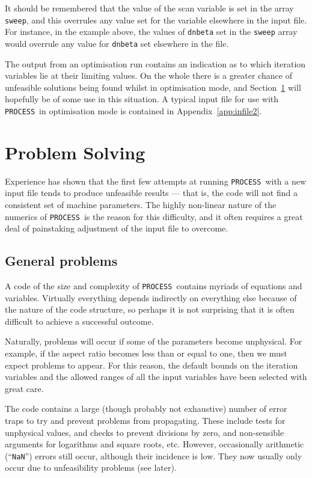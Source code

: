 \documentclass[11pt,a4paper]{report}
\newcommand{\process}{\mbox{\texttt{PROCESS}}}
\begin{document}
It should be remembered that the value of the scan variable is set in the
array \texttt{sweep}, and this overrules any value set for the variable
elsewhere in the input file. For instance, in the example above, the values of
\texttt{dnbeta} set in the \texttt{sweep} array would overrule any value for
\texttt{dnbeta} set elsewhere in the file.

The output from an optimisation run contains an indication as to which
iteration variables lie at their limiting values. On the whole there is a
greater chance of unfeasible solutions being found whilst in optimisation
mode, and Section~\ref{sec:problems} will hopefully be of some use in this
situation. A typical input file for use with \process\ in optimisation mode
is contained in Appendix~\ref{app:infile2}.

\section{Problem Solving}
\label{sec:problems}

Experience has shown that the first few attempts at running \process\ with a
new input file tends to produce unfeasible results --- that is, the code will
not find a consistent set of machine parameters. The highly non-linear nature
of the numerics of \process\ is the reason for this difficulty, and it often
requires a great deal of painstaking adjustment of the input file to overcome.

\subsection{General problems}

A code of the size and complexity of \process\ contains myriads of equations
and variables. Virtually everything depends indirectly on everything else
because of the nature of the code structure, so perhaps it is not surprising
that it is often difficult to achieve a successful outcome.

Naturally, problems will occur if some of the parameters become unphysical.
For example, if the aspect ratio becomes less than or equal to one, then we
must expect problems to appear. For this reason, the default bounds on the
iteration variables and the allowed ranges of all the input variables have
been selected with great care.

The code contains a large (though probably not exhaustive) number of error
traps to try and prevent problems from propagating. These include tests for
unphysical values, and checks to prevent divisions by zero, and non-sensible
arguments for logarithms and square roots, etc. However, occasionally
arithmetic (``\texttt{NaN}'') errors still occur, although their incidence is
low. They now usually only occur due to unfeasibility problems (see later).
\end{document}

